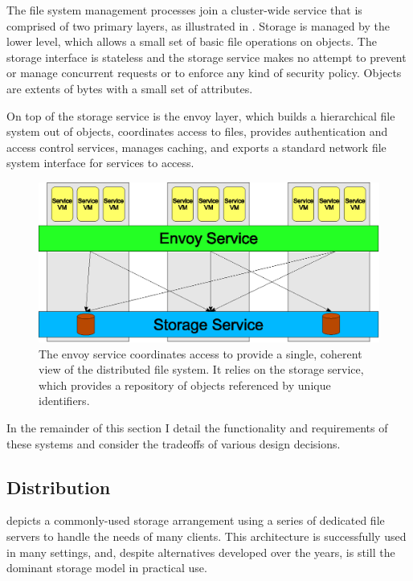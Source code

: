 The file system management processes join a cluster-wide service that is comprised of two primary layers, as illustrated in . Storage is managed by the lower level, which allows a small set of basic file operations on objects. The storage interface is stateless and the storage service makes no attempt to prevent or manage concurrent requests or to enforce any kind of security policy. Objects are extents of bytes with a small set of attributes.

On top of the storage service is the envoy layer, which builds a hierarchical file system out of objects, coordinates access to files, provides authentication and access control services, manages caching, and exports a standard network file system interface for services to access.

\begin{figure}[tp]
\centering
\includegraphics[width=\figwidth]{figures/layers}
\caption[The layers of the Envoy file system]{The envoy service coordinates access to provide a single, coherent view of the distributed file system. It relies on the storage service, which provides a repository of objects referenced by unique identifiers.}
\label{fig:layers}
\end{figure}

In the remainder of this section I detail the functionality and requirements of these systems and consider the tradeoffs of various design decisions.

\subsection{Distribution}

 depicts a commonly-used storage arrangement using a series of dedicated file servers to handle the needs of many clients. This architecture is successfully used in many settings, and, despite alternatives developed over the years, is still the dominant storage model in practical use.

